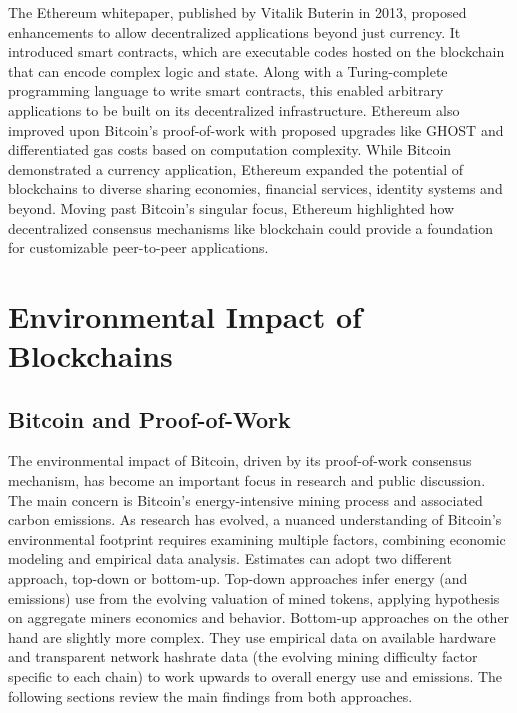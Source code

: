 \documentclass[11pt]{report}
\begin{document}
The Ethereum whitepaper\cite{buterinEthereumNextgenerationSmart}, published by Vitalik Buterin in 2013, proposed enhancements to allow decentralized applications beyond just currency. It introduced smart contracts, which are executable codes hosted on the blockchain that can encode complex logic and state. Along with a Turing-complete programming language to write smart contracts, this enabled arbitrary applications to be built on its decentralized infrastructure. Ethereum also improved upon Bitcoin's proof-of-work with proposed upgrades like GHOST and differentiated gas costs based on computation complexity. While Bitcoin demonstrated a currency application, Ethereum expanded the potential of blockchains to diverse sharing economies, financial services, identity systems and beyond. Moving past Bitcoin's singular focus, Ethereum highlighted how decentralized consensus mechanisms like blockchain could provide a foundation for customizable peer-to-peer applications. 

\cite{bloombergnewsEthereumMergeYour2022} 

\cite{easleyMiningMarketsEvolution2019}

\section{Environmental Impact of Blockchains}
\subsection{Bitcoin and Proof-of-Work}
The environmental impact of Bitcoin, driven by its proof-of-work consensus mechanism, has become an important focus in research and public discussion. The main concern is Bitcoin's energy-intensive mining process and associated carbon emissions. As research has evolved, a nuanced understanding of Bitcoin's environmental footprint requires examining multiple factors, combining economic modeling and empirical data analysis. Estimates can adopt two different approach, top-down or bottom-up. Top-down approaches infer energy (and emissions) use from the evolving valuation of mined tokens, applying hypothesis on aggregate miners economics and behavior. Bottom-up approaches on the other hand are slightly more complex. They use empirical data on available hardware and transparent network hashrate data (the evolving mining difficulty factor specific to each chain) to work upwards to overall energy use and emissions. The following sections review the main findings from both approaches.
\end{document}
